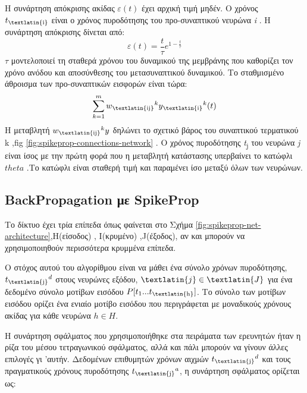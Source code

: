 \documentclass[12pt]{report}
\begin{document}
Η συνάρτηση απόκρισης ακίδας  \(\varepsilon(t)\) έχει αρχική τιμή μηδέν. Ο χρόνος \(t\textsubscript{\textlatin{i}}\) είναι ο χρόνος πυροδότησης του προ-συναπτικού νευρώνα \textit{\textlatin{i}} . Η συνάρτηση απόκρισης δίνεται από: 
\begin{equation}
    \varepsilon(t)=\frac{t}{\tau}e^{1-\frac{t}{\tau}}
\end{equation}
\(\tau\) μοντελοποιεί τη σταθερά χρόνου του δυναμικού της μεμβράνης  που καθορίζει τον χρόνο ανόδου και αποσύνθεσης του μετασυναπτικού δυναμικού. Το σταθμισμένο άθροισμα των προ-συναπτικών εισφορών είναι τώρα:
\[ \sum_{k=1}^{m}w\textsubscript{\textlatin{ij}}^ky\textsubscript{\textlatin{i}}^k(t) \]
H μεταβλητή \(w\textsubscript{\textlatin{ij}}^ky\) δηλώνει το σχετικό βάρος του συναπτικού τερματικού k ,\textlatin{fig} \ref{fig:spikeprop-connections-network} . Ο χρόνος πυροδότησης \textit{\textlatin{t}}\textsubscript{\textlatin{j}} του νευρώνα \textit{\textlatin{j}} είναι ίσος με την πρώτη φορά που η μεταβλητή κατάστασης υπερβαίνει το κατώφλι \(theta\) .Το κατώφλι είναι σταθερή τιμή και παραμένει ίσο μεταξύ όλων των νευρώνων.

\subsection{\textlatin{BackPropagation} με \textlatin{SpikeProp}}

Το δίκτυο έχει τρία επίπεδα όπως φαίνεται στο Σχήμα \ref{fig:spikeprop-net-architecture},\textlatin{H}(είσοδος) , \textlatin{I}(κρυμένο) ,\textlatin{J}(έξοδος), αν και μπορούν να χρησιμοποιηθούν περισσότερα κρυμμένα επίπεδα.

Ο στόχος αυτού του αλγορίθμου είναι να μάθει ένα σύνολο χρόνων πυροδότησης,{\(t\textsubscript{\textlatin{j}}^d\)} στους νευρώνες εξόδου, {\(\textlatin{j}\in \textlatin{J}\)} για ένα δεδομένο σύνολο μοτίβων εισόδου {\(P[t\textsubscript{1}...t\textsubscript{\textlatin{h}}]\)}. Το σύνολο των μοτίβων εισόδου ορίζει ένα ενιαίο μοτίβο εισόδου που περιγράφεται με μοναδικούς χρόνους ακίδας για κάθε νευρώνα {\(h\in H\)}.

Η συνάρτηση σφάλματος που χρησιμοποιήθηκε στα πειράματα των ερευνητών ήταν η ρίζα του μέσου τετραγωνικού σφάλματος, αλλά και πάλι μπορούν να γίνουν άλλες επιλογές γι 'αυτήν. Δεδομένων επιθυμητών χρόνων αιχμών
{\(t\textsubscript{\textlatin{j}}^d\)} και τους πραγματικούς χρόνους πυροδότησης {\(t\textsubscript{\textlatin{j}}^a\)}, η συνάρτηση σφάλματος ορίζεται ως:
\end{document}
